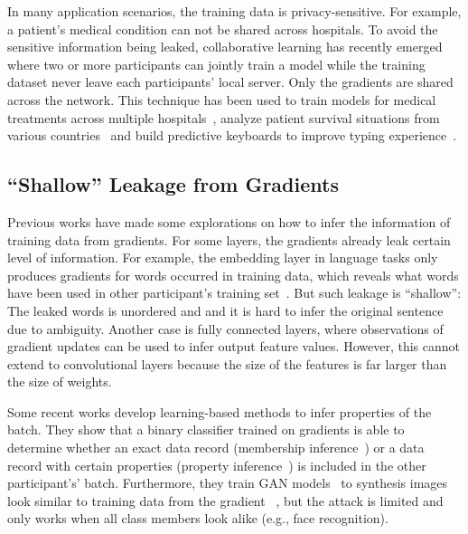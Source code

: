 In many application scenarios, the training data is privacy-sensitive. For example, a patient's medical condition can not be shared across hospitals. To avoid the sensitive information being leaked, collaborative learning has recently emerged~\cite{jochems2017developing, jochems2016distributed, mcmahan2016communication} where two or more participants can jointly train a model while the training dataset never leave each participants' local server. Only the gradients are shared across the network.
% 
This technique has been used to train models for medical treatments across multiple hospitals~\cite{jochems2016distributed}, analyze patient survival situations from various countries~\cite{jochems2017developing} and build predictive keyboards to improve typing experience~\cite{mcmahan2016communication, google2016federated, bonawitz2019towards}.

\subsection{``Shallow'' Leakage from Gradients} %
Previous works have made some explorations on how to infer the information of training data from gradients.
For some layers, the gradients already leak certain level of information. For example, the embedding layer in language tasks only produces gradients for words occurred in training data, which reveals what words have been used in other participant's training set~\cite{Melis2018unintended}. But such leakage is ``shallow'': The leaked words is unordered and and it is hard to infer the original sentence due to ambiguity.
% 
Another case is fully connected layers, where observations of gradient updates can be used to infer output feature values. However, this cannot extend to convolutional layers because the size of the features is far larger than the size of weights. 

Some recent works develop learning-based methods to infer properties of the batch. They show that a binary classifier trained on gradients is able to determine whether an exact data record (membership inference~\cite{shokri2017membership, Melis2018unintended}) or a data record with certain properties (property inference~\cite{Melis2018unintended}) is included in the other participant's' batch. Furthermore, they train GAN models~\cite{goodfellow2014generative} to synthesis images look similar to training data from the gradient ~\cite{hitaj2017information, Melis2018unintended, fredrikson2015model_inversion}, but the attack is limited and only works when all class members look alike (e.g., face recognition).

